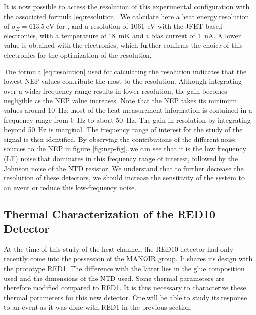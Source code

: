 It is now possible to access the resolution of this experimental configuration with the associated formula \ref{eq:resolution}. We calculate here a heat energy resolution of $\sigma_E = \SI{613.5}{\eV}$ for \Edelweiss{}, and a resolution of \SI{1061}{\eV} with the JFET-based electronics, with a temperature of \SI{18}{\milli\kelvin} and a bias current of \SI{1}{\nano\ampere}. A lower value is obtained with the \Edelweiss{} electronics, which further confirms the choice of this electronics for the optimization of the resolution.

The formula \ref{eq:resolution} used for calculating the resolution indicates that the lowest NEP values contribute the most to the resolution. Although integrating over a wider frequency range results in lower resolution, the gain becomes negligible as the NEP value increases.
Note that the NEP takes its minimum values around \SI{10}{\Hz}: most of the heat measurement information is contained in a frequency range from \SI{0}{\Hz} to about \SI{50}{Hz}. The gain in resolution by integrating beyond \SI{50}{\Hz} is marginal. The frequency range of interest for the study of the signal is then identified. By observing the contributions of the different noise sources to the NEP in figure \ref{fig:nep-fig}, we can see that it is the low frequency (LF) noise that dominates in this frequency range of interest, followed by the Johnson noise of the NTD resistor. We understand that to further decrease the resolution of these detectors, we should increase the sensitivity of the system to an event or reduce this low-frequency noise. %



\subsection{Thermal Characterization of the RED10 Detector}

At the time of this study of the heat channel, the RED10 detector had only recently come into the possession of the MANOIR group. It shares its design with the prototype RED1. The difference with the latter lies in the glue composition used and the dimensions of the NTD used. Some thermal parameters are therefore modified compared to RED1. It is thus necessary to characterize these thermal parameters for this new detector. One will be able to study its response to an event as it was done with RED1 in the previous section.

